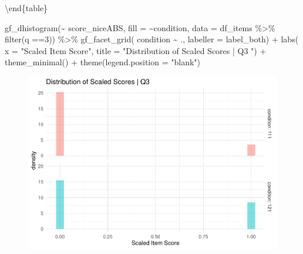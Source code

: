 \documentclass[
  letterpaper,
  DIV=11,
  numbers=noendperiod]{scrreprt}
\newenvironment{Shaded}{\begin{snugshade}}{\end{snugshade}}
\newcommand{\AttributeTok}[1]{\textcolor[rgb]{0.40,0.45,0.13}{#1}}
\newcommand{\DecValTok}[1]{\textcolor[rgb]{0.68,0.00,0.00}{#1}}
\newcommand{\FunctionTok}[1]{\textcolor[rgb]{0.28,0.35,0.67}{#1}}
\newcommand{\NormalTok}[1]{\textcolor[rgb]{0.00,0.23,0.31}{#1}}
\newcommand{\SpecialCharTok}[1]{\textcolor[rgb]{0.37,0.37,0.37}{#1}}
\newcommand{\StringTok}[1]{\textcolor[rgb]{0.13,0.47,0.30}{#1}}
\begin{document}
\textbackslash end\{table\}

\begin{Shaded}
\begin{Highlighting}[]
\FunctionTok{gf\_dhistogram}\NormalTok{(}\SpecialCharTok{\textasciitilde{}}\NormalTok{ score\_niceABS, }\AttributeTok{fill =} \SpecialCharTok{\textasciitilde{}}\NormalTok{condition, }\AttributeTok{data =}\NormalTok{ df\_items }\SpecialCharTok{\%\textgreater{}\%} \FunctionTok{filter}\NormalTok{(q }\SpecialCharTok{==}\DecValTok{3}\NormalTok{)) }\SpecialCharTok{\%\textgreater{}\%} 
  \FunctionTok{gf\_facet\_grid}\NormalTok{( condition }\SpecialCharTok{\textasciitilde{}}\NormalTok{ ., }\AttributeTok{labeller =}\NormalTok{ label\_both) }\SpecialCharTok{+} 
  \FunctionTok{labs}\NormalTok{( }\AttributeTok{x =} \StringTok{"Scaled Item Score"}\NormalTok{, }\AttributeTok{title =} \StringTok{"Distribution of Scaled Scores | Q3 "}\NormalTok{) }\SpecialCharTok{+} 
  \FunctionTok{theme\_minimal}\NormalTok{() }\SpecialCharTok{+} \FunctionTok{theme}\NormalTok{(}\AttributeTok{legend.position =} \StringTok{"blank"}\NormalTok{)}
\end{Highlighting}
\end{Shaded}

\begin{figure}[H]

{\centering \includegraphics{analysis/SGC3A/2_sgc3A_scoring_files/figure-pdf/Q3-distribution-1.pdf}

}

\end{figure}
\end{document}
